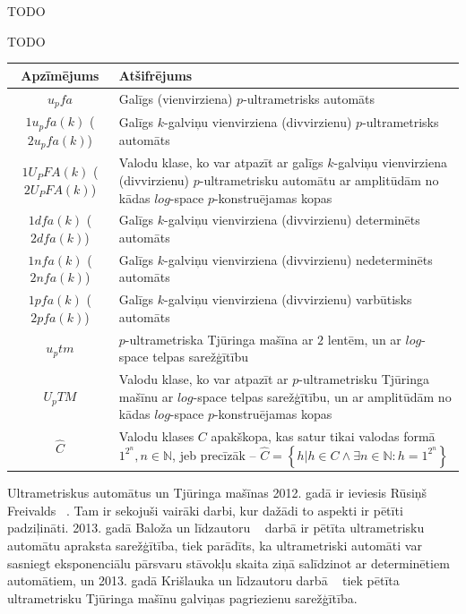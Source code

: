 \documentclass{ludis}
\begin{document}
\maketitle

\begin{abstract-lv}
TODO
\end{abstract-lv}
\clearpage

\begin{abstract-en}
TODO
\end{abstract-en}


\tableofcontents

\setlength\LTleft{0pt}
\setlength\LTright{0pt}
\begin{longtable}{| c | p{28em} |}
  \hline
  \textbf{Apzīmējums} & \textbf{Atšifrējums}\\ 
  \endhead

  \hline
  $u_pfa$ & Galīgs (vienvirziena) $p$-ultrametrisks automāts\\
  $1u_pfa(k)$ ($2u_pfa(k)$) &  Galīgs $k$-galviņu vienvirziena (divvirzienu) $p$-ultrametrisks automāts\\
  $1U_PFA(k)$ ($2U_PFA(k)$) &  Valodu klase, ko var atpazīt ar galīgs $k$-galviņu vienvirziena (divvirzienu) $p$-ultrametrisku automātu ar amplitūdām no kādas $log$-space $p$-konstruējamas kopas\\
  $1dfa(k)$ ($2dfa(k)$) &  Galīgs $k$-galviņu vienvirziena (divvirzienu) determinēts automāts\\
  $1nfa(k)$ ($2nfa(k)$) &  Galīgs $k$-galviņu vienvirziena (divvirzienu) nedeterminēts automāts\\
  $1pfa(k)$ ($2pfa(k)$) &  Galīgs $k$-galviņu vienvirziena (divvirzienu) varbūtisks automāts\\
  $u_ptm$ &  $p$-ultrametriska Tjūringa mašīna ar $2$ lentēm, un ar $log$-space telpas sarežģītību\\
  $U_pTM$ &  Valodu klase, ko var atpazīt ar $p$-ultrametrisku Tjūringa mašīnu ar $log$-space telpas sarežģītību, un ar amplitūdām no kādas $log$-space $p$-konstruējamas kopas\\
  $\widehat{C}$ & Valodu klases $C$ apakškopa, kas satur tikai valodas formā $1^{2^n}, n \in \mathbb{N}$, jeb precīzāk -- $\widehat{C} = \left\{ h | h \in C \wedge \exists n \in \mathbb{N} : h = 1^{2^n} \right\}$\\
  \hline
\end{longtable}

Ultrametriskus automātus un Tjūringa mašīnas 2012. gadā ir ieviesis Rūsiņš Freivalds ~\citep{Freivalds2012}. Tam ir sekojuši vairāki darbi, kur dažādi to aspekti ir pētīti padziļināti. 2013. gadā Baloža un līdzautoru ~\citep{KasparsBalodis2013} darbā ir pētīta ultrametrisku automātu apraksta sarežģītība, %
tiek parādīts, ka ultrametriski automāti var sasniegt eksponenciālu pārsvaru stāvokļu skaita ziņā salīdzinot ar determinētiem automātiem, un 2013. gadā Krišlauka un līdzautoru darbā ~\citep{Krislauks2013} tiek pētīta ultrametrisku Tjūringa mašīnu galviņas pagriezienu sarežģītība.
\end{document}
